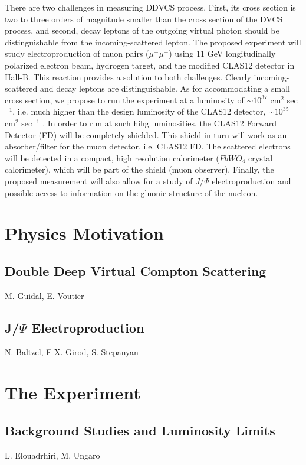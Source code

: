 \documentclass[superscriptaddress,preprintnumbers,amsmath,amssymb,aps,11pt]{revtex4}
\begin{document}
There are two challenges in measuring DDVCS process. First, its cross section is two to three orders of magnitude smaller than the cross section of the DVCS process, and second, decay leptons of the outgoing virtual photon should be distinguishable from the incoming-scattered lepton.
The proposed experiment will study electroproduction of muon pairs ($\mu^+\mu^-$) using 11 GeV longitudinally polarized electron beam, hydrogen target, and the modified CLAS12 detector in Hall-B. This reaction provides a solution to both challenges. Clearly incoming-scattered and decay leptons are distinguishable. As for accommodating a small cross section, we propose to run the experiment at a luminosity of $\sim 10^{37}$ cm$^2$ sec$^{-1}$, i.e. much higher than the design luminosity of the CLAS12 detector, $\sim 10^{35}$ cm$^2$ sec$^{-1}$ \cite{clas12}. In order to run at such hihg luminosities, the CLAS12 Forward Detector (FD) will be completely shielded. This shield in turn will work as an absorber/filter for the muon detector, i.e. CLAS12 FD. The scattered electrons will be detected in a compact, high resolution calorimeter ($PbWO_4$ crystal calorimeter), which will be part of the shield (muon observer). 
Finally, the proposed measurement will also allow for a study of $J/\Psi$ electroproduction and possible access to information on the gluonic structure of the nucleon.    

\section{Physics Motivation}

\subsection{Double Deep Virtual Compton Scattering}
M. Guidal, E. Voutier

\clearpage

\subsection{J/$\Psi$ Electroproduction}
N. Baltzel, F-X. Girod, S. Stepanyan



\section{The Experiment}


\subsection{Background Studies and Luminosity Limits}
L. Elouadrhiri, M. Ungaro
\end{document}
